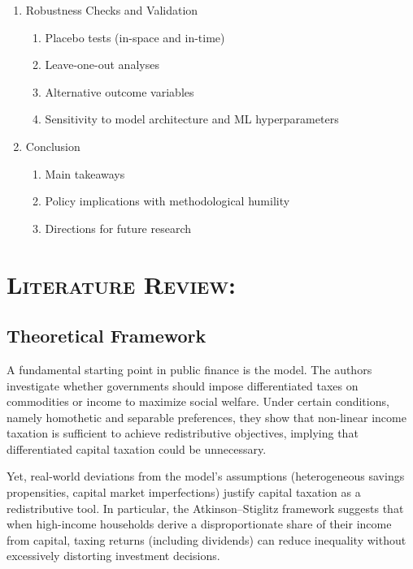 \documentclass[11pt,a4paper]{article}
\begin{document}
\begin{enumerate}[leftmargin= 2cm]
    \item Robustness Checks and Validation
    \begin{enumerate}
        \item Placebo tests (in-space and in-time)
        \item Leave-one-out analyses
        \item Alternative outcome variables
        \item Sensitivity to model architecture and ML hyperparameters
    \end{enumerate}

    \item Conclusion
    \begin{enumerate}
        \item Main takeaways
        \item Policy implications with methodological humility
        \item Directions for future research
    \end{enumerate}
\end{enumerate}

\newpage
\section{\textsc{Literature Review:}}
\subsection{Theoretical Framework }
\par
A fundamental starting point in public finance is the \cite{atkinson_design_1976} model. 
The authors investigate whether governments should impose differentiated taxes on commodities or income to maximize social welfare. 
Under certain conditions, namely homothetic and separable preferences, they show that non-linear income taxation is sufficient to achieve redistributive objectives, implying that differentiated capital taxation could be unnecessary.

\par
Yet, real-world deviations from the model’s assumptions (heterogeneous savings propensities, capital market imperfections) justify capital taxation as a redistributive tool. 
In particular, the Atkinson–Stiglitz framework suggests that when high-income households derive a disproportionate share of their income from capital, taxing returns (including dividends) can reduce inequality without excessively distorting investment decisions.
\end{document}
